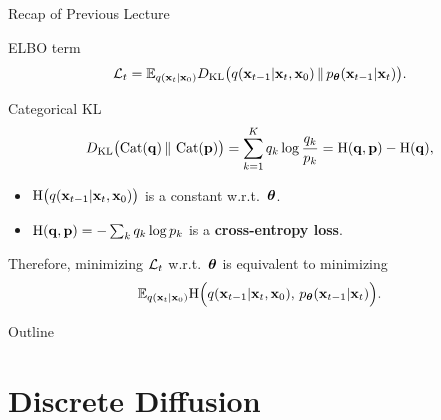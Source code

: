 \documentclass{beamer}
\begin{document}
\begin{frame}{Recap of Previous Lecture}

	\begin{block}{ELBO term}
		\vspace{-0.3cm}
		\[
			\mathcal{L}_t
			= \mathbb{E}_{q(\mathbf{x}_t | \mathbf{x}_0)}
			D_\mathrm{KL}\bigl(q(\mathbf{x}_{t-1} | \mathbf{x}_t, \mathbf{x}_0) \,\|\, p_{\boldsymbol{\theta}}(\mathbf{x}_{t-1} | \mathbf{x}_t)\bigr).
		\]
		\vspace{-0.3cm}
	\end{block}
	\begin{block}{Categorical KL}
		\vspace{-0.3cm}
		\[
			D_\mathrm{KL}\bigl(\operatorname{Cat}(\mathbf{q}) \,\|\, \operatorname{Cat}(\mathbf{p})\bigr)
			= \sum_{k=1}^K q_k \log \frac{q_k}{p_k}
			= \mathrm{H}(\mathbf{q},\mathbf{p}) - \mathrm{H}(\mathbf{q}),
		\]
		\begin{itemize}
			\item $\mathrm{H}\bigl(q(\mathbf{x}_{t-1} | \mathbf{x}_t, \mathbf{x}_0)\bigr)$ is a constant w.r.t.~$\boldsymbol{\theta}$.
			\item $\mathrm{H}(\mathbf{q},\mathbf{p}) = -\sum_k q_k \log p_k$ is a \textbf{cross-entropy loss}.
		\end{itemize}
	\end{block}
	Therefore, minimizing $\mathcal{L}_t$ w.r.t.~$\boldsymbol{\theta}$ is equivalent to minimizing
	\[
		\mathbb{E}_{q(\mathbf{x}_t | \mathbf{x}_0)}
		\mathrm{H}\Bigl(q(\mathbf{x}_{t-1} | \mathbf{x}_t, \mathbf{x}_0),\, p_{\boldsymbol{\theta}}(\mathbf{x}_{t-1} | \mathbf{x}_t)\Bigr).
	\]
\end{frame}
\begin{frame}{Outline}
	\tableofcontents
\end{frame}
\section{Discrete Diffusion}
\end{document}
